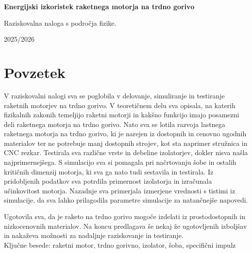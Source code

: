 \documentclass[titlepage, a4paper, twoside, final, 12pt]{article}
\begin{document}
\begin{titlepage}
	\begin{center}
		\vspace*{1cm}
		\huge
		\textbf{Energijski izkoristek raketnega motorja na trdno gorivo}
			
		\vspace{15cm}

		\normalsize
		Raziskovalna naloga s področja fizike.

		2025/2026

	\end{center}
\end{titlepage}

\renewcommand{\thepage}{\Roman{page}}
\renewcommand{\abstractname}{Zahvala}
\begin{abstract}
	\thispagestyle{plain}
	\setcounter{page}{2}
	Zahvalila bi se rada za vso pomoč, ki sva je bila deležna ob raziskovanju in ustvarjanju naloge. 
\end{abstract}


	\renewcommand{\thepage}{\Roman{page}}
		\thispagestyle{plain}
		\setcounter{page}{3}
		\section*{Povzetek}
		V raziskovalni nalogi sva se poglobila v delovanje, simuliranje in testiranje raketnih motorjev na trdno gorivo. V teoretičnem delu sva opisala, na katerih fizikalnih zakonih temeljijo raketni motorji in kakšno funkcijo imajo posamezni deli raketnega motorja na trdno gorivo. Nato sva se lotila razvoja lastnega raketnega motorja na trdno gorivo, ki je narejen iz dostopnih in cenovno ugodnih materialov ter ne potrebuje manj dostopnih strojev, kot sta naprimer stružnica in CNC rezkar. Testirala sva različne vrste in debeline izolatorjev, dokler nisva našla najprimernejšega. S simulacijo sva si pomagala pri načrtovanju šobe in ostalih kritičnih dimenzij motorja, ki sva ga nato tudi sestavila in testirala. Iz pridobljenih podatkov sva potrdila primernost izolatorja in izračunala učinkovitost motorja. Nazadnje sva primerjala izmerjene vrednosti s tistimi iz simulacije, da sva lahko prilagodila parametre simulacije za natančnejše napovedi.

		Ugotovila sva, da je raketo na trdno gorivo mogoče izdelati iz prostodostopnih in nizkocenovnih materialov. Na koncu predlagava še nekaj že ugotovljenih izboljšav in nakaževa možnosti za nadaljnje raziskovanje in testiranje.
		\\[2ex]
		Ključne besede: raketni motor, trdno gorivno, izolator, šoba, specifični impulz
\end{document}
